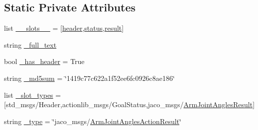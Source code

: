 \subsection*{Static Private Attributes}
\begin{DoxyCompactItemize}
\item 
list \hyperlink{classjaco__msgs_1_1msg_1_1__ArmJointAnglesActionResult_1_1ArmJointAnglesActionResult_a9185a40360f5be8a020a8810e572d749}{\+\_\+\+\_\+slots\+\_\+\+\_\+} = \mbox{[}\textquotesingle{}\hyperlink{classjaco__msgs_1_1msg_1_1__ArmJointAnglesActionResult_1_1ArmJointAnglesActionResult_a42432041a06f195ca4c7566f6157062e}{header}\textquotesingle{},\textquotesingle{}\hyperlink{classjaco__msgs_1_1msg_1_1__ArmJointAnglesActionResult_1_1ArmJointAnglesActionResult_abc96fae35bee25ca7d43d60fb9a09cc2}{status}\textquotesingle{},\textquotesingle{}\hyperlink{classjaco__msgs_1_1msg_1_1__ArmJointAnglesActionResult_1_1ArmJointAnglesActionResult_a834e2d539b66918188653979cece4d81}{result}\textquotesingle{}\mbox{]}
\item 
string \hyperlink{classjaco__msgs_1_1msg_1_1__ArmJointAnglesActionResult_1_1ArmJointAnglesActionResult_a1dac98d7078cee0362a0be5c46414713}{\+\_\+full\+\_\+text}
\item 
bool \hyperlink{classjaco__msgs_1_1msg_1_1__ArmJointAnglesActionResult_1_1ArmJointAnglesActionResult_a0d8cd80d84104df05d41106cf053d7fd}{\+\_\+has\+\_\+header} = True
\item 
string \hyperlink{classjaco__msgs_1_1msg_1_1__ArmJointAnglesActionResult_1_1ArmJointAnglesActionResult_a008b66f4a6dbaf7c1f656a07b6ac4f03}{\+\_\+md5sum} = \char`\"{}1419c77c622a1f52ee6fc0926c8ae186\char`\"{}
\item 
list \hyperlink{classjaco__msgs_1_1msg_1_1__ArmJointAnglesActionResult_1_1ArmJointAnglesActionResult_a34ae14cde287329c3aed67471c9135ec}{\+\_\+slot\+\_\+types} = \mbox{[}\textquotesingle{}std\+\_\+msgs/Header\textquotesingle{},\textquotesingle{}actionlib\+\_\+msgs/Goal\+Status\textquotesingle{},\textquotesingle{}jaco\+\_\+msgs/\hyperlink{classjaco__msgs_1_1msg_1_1__ArmJointAnglesResult_1_1ArmJointAnglesResult}{Arm\+Joint\+Angles\+Result}\textquotesingle{}\mbox{]}
\item 
string \hyperlink{classjaco__msgs_1_1msg_1_1__ArmJointAnglesActionResult_1_1ArmJointAnglesActionResult_a99613d6f8aeeccd505acaab64ac11631}{\+\_\+type} = \char`\"{}jaco\+\_\+msgs/\hyperlink{classjaco__msgs_1_1msg_1_1__ArmJointAnglesActionResult_1_1ArmJointAnglesActionResult}{Arm\+Joint\+Angles\+Action\+Result}\char`\"{}
\end{DoxyCompactItemize}


